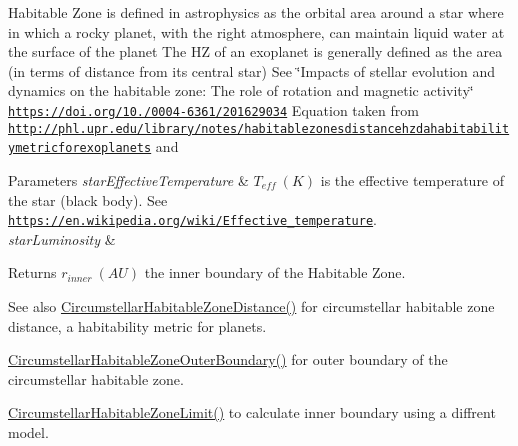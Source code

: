 Habitable Zone is defined in astrophysics as the orbital area around a star where in which a rocky planet, with the right atmosphere, can maintain liquid water at the surface of the planet The HZ of an exoplanet is generally defined as the area (in terms of distance from its central star) See \char`\"{}\+Impacts of stellar evolution and dynamics on the habitable zone\+: The role of rotation and magnetic activity\char`\"{} \href{https://doi.org/10.1051/0004-6361/201629034}{\tt https\+://doi.\+org/10./0004-\/6361/201629034} Equation taken from \href{http://phl.upr.edu/library/notes/habitablezonesdistancehzdahabitabilitymetricforexoplanets}{\tt http\+://phl.\+upr.\+edu/library/notes/habitablezonesdistancehzdahabitabilitymetricforexoplanets} and 
\begin{DoxyParams}{Parameters}
{\em star\+Effective\+Temperature} & $T_{eff}\ (K)$ is the effective temperature of the star (black body). See \href{https://en.wikipedia.org/wiki/Effective_temperature}{\tt https\+://en.\+wikipedia.\+org/wiki/\+Effective\+\_\+temperature}. \\
\hline
{\em star\+Luminosity} & \\
\hline
\end{DoxyParams}
\begin{DoxyReturn}{Returns}
$r_{inner}\ (AU)$ the inner boundary of the Habitable Zone. 
\end{DoxyReturn}
\begin{DoxySeeAlso}{See also}
\mbox{\hyperlink{group___e_g_x_phys-_circumstellar_habitable_zone_limit_gacf3a720793cdb27f6d93b170b44e81be}{Circumstellar\+Habitable\+Zone\+Distance()}} for circumstellar habitable zone distance, a habitability metric for planets. 

\mbox{\hyperlink{group___e_g_x_phys-_circumstellar_habitable_zone_limit_gaa47fcde814ba8007de800e930fc0a08d}{Circumstellar\+Habitable\+Zone\+Outer\+Boundary()}} for outer boundary of the circumstellar habitable zone. 

\mbox{\hyperlink{group___e_g_x_phys-_circumstellar_habitable_zone_limit_ga23a8f602461ea3257e8767b1d455c383}{Circumstellar\+Habitable\+Zone\+Limit()}} to calculate inner boundary using a diffrent model. 
\end{DoxySeeAlso}
\mbox{\label{group___e_g_x_phys-_circumstellar_habitable_zone_limit_ga23a8f602461ea3257e8767b1d455c383}} 
